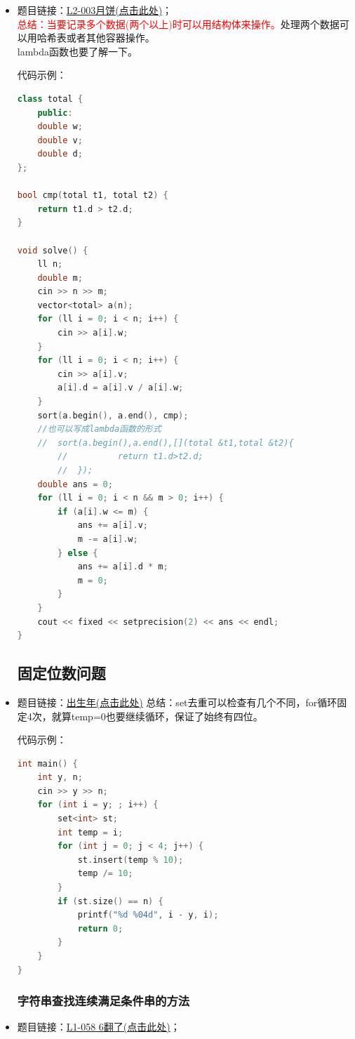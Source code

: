 \begin{itemize}
\subsection{结构体的使用}
\item 题目链接：\href{https://pintia.cn/problem-sets/994805046380707840/exam/problems/type/7?problemSetProblemId=994805071789801472&page=1}{L2-003月饼(点击此处)}；\\\textcolor{red}{总结：当要记录多个数据(两个以上)时可以用结构体来操作。}处理两个数据可以用哈希表或者其他容器操作。
\\lambda函数也要了解一下。

代码示例：\\
\begin{lstlisting}[language=C++]
class total {
	public:
	double w;
	double v;
	double d;
};

bool cmp(total t1, total t2) {
	return t1.d > t2.d;
}

void solve() {
	ll n;
	double m;
	cin >> n >> m;
	vector<total> a(n);
	for (ll i = 0; i < n; i++) {
		cin >> a[i].w;
	}
	for (ll i = 0; i < n; i++) {
		cin >> a[i].v;
		a[i].d = a[i].v / a[i].w;
	}
	sort(a.begin(), a.end(), cmp);
	//也可以写成lambda函数的形式
	//  sort(a.begin(),a.end(),[](total &t1,total &t2){
		//          return t1.d>t2.d;
		//  });
	double ans = 0;
	for (ll i = 0; i < n && m > 0; i++) {
		if (a[i].w <= m) {
			ans += a[i].v;
			m -= a[i].w;
		} else {
			ans += a[i].d * m;
			m = 0;
		}
	}
	cout << fixed << setprecision(2) << ans << endl;
}
\end{lstlisting}
\subsection{固定位数问题}
\item 题目链接：\href{https://pintia.cn/problem-sets/994805046380707840/exam/problems/type/7?problemSetProblemId=994805099426070528}{出生年(点击此处)}  总结：set去重可以检查有几个不同，for循环固定4次，就算temp=0也要继续循环，保证了始终有四位。

代码示例：\\
\begin{lstlisting}[language=C++]
int main() {
	int y, n;
	cin >> y >> n;
	for (int i = y; ; i++) {
		set<int> st;
		int temp = i;
		for (int j = 0; j < 4; j++) {
			st.insert(temp % 10);
			temp /= 10;
		}
		if (st.size() == n) {
			printf("%d %04d", i - y, i);
			return 0;
		}
	}
}
\end{lstlisting}
\subsubsection{字符串查找连续满足条件串的方法}
\item 题目链接：\href{https://pintia.cn/problem-sets/994805046380707840/exam/problems/type/7?problemSetProblemId=1111914599408664577}{L1-058 6翻了(点击此处)}；


\end{itemize}
